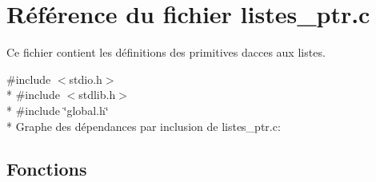 \hypertarget{a00008}{}\section{Référence du fichier listes\+\_\+ptr.\+c}
\label{a00008}


Ce fichier contient les définitions des primitives d\textquotesingle{}acces aux listes.  


{\ttfamily \#include $<$stdio.\+h$>$}\\*
{\ttfamily \#include $<$stdlib.\+h$>$}\\*
{\ttfamily \#include \char`\"{}global.\+h\char`\"{}}\\*
Graphe des dépendances par inclusion de listes\+\_\+ptr.\+c\+:
\subsection*{Fonctions}
